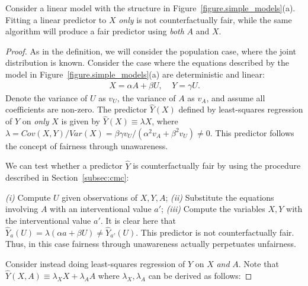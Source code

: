 \begin{lem}
Consider a linear model with the structure in
Figure~\ref{figure.simple_models}(a).  Fitting a linear predictor to
$X$ \emph{only} is not counterfactually fair, while the same algorithm
will produce a fair predictor using \emph{both} $A$ and $X$.
\end{lem}

\begin{proof}
As in the definition, we will consider the population case, where the
joint distribution is known. Consider the case where the equations
described by the model in Figure~\ref{figure.simple_models}(a)
are deterministic and linear:
\begin{align}
X = \alpha A + \beta U, \;\;\;\; Y = \gamma U. \nonumber
\end{align}
Denote the variance of $U$ as $v_U$, the variance of $A$ as $v_A$, and
assume all coefficients are non-zero. The predictor $\hat Y(X)$
defined by least-squares regression of $Y$ on \emph{only} $X$ is given
by $\hat Y(X) \equiv \lambda X$, where $\lambda = Cov(X, Y) / Var(X)
\!=\! \beta\gamma v_U / (\alpha^2 v_A + \beta^2 v_U) \neq 0$. This 
predictor follows the concept of fairness through unawareness.

We can test whether a predictor $\hat{Y}$ is counterfactually fair
by using the procedure described in Section~\ref{subsec:cmc}:

{\em (i)} Compute $U$ given observations of $X,Y,A$; %
{\em (ii)} Substitute the equations involving $A$ with an interventional value $a'$; 
{\em (iii)} Compute the variables $X,Y$ with the interventional value
$a'$. It is clear here that $\hat Y_a(U) \!=\! \lambda(\alpha a +
\beta U) \neq \hat Y_{a'}(U)$. This predictor is not counterfactually
fair. Thus, in this case fairness through unawareness actually
perpetuates unfairness.

Consider instead doing least-squares regression of $Y$ on $X$
\emph{and} $A$. Note that $\hat Y(X,A) \equiv \lambda_X X + \lambda_A
A$ where $\lambda_X,\lambda_A$ can be derived as follows:


\end{proof}
